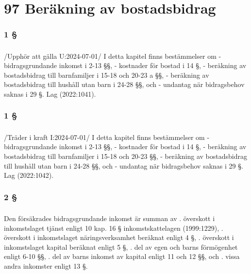\documentclass[a4paper,notitlepage,openany,10pt]{book}
\begin{document}
\chapter*{97 Beräkning av bostadsbidrag}
\subsection*{1 §}
\paragraph*{}
/Upphör att gälla U:2024-07-01/
I detta kapitel finns bestämmelser om
\newline - bidragsgrundande inkomst i 2-13 §§,
\newline - kostnader för bostad i 14 §,
\newline - beräkning av bostadsbidrag till barnfamiljer i 15-18 och 20-23 a §§,
\newline - beräkning av bostadsbidrag till hushåll utan barn i 24-28 §§, och
\newline - undantag när bidragsbehov saknas i 29 §.
Lag (2022:1041).
\subsection*{1 §}
\paragraph*{}
/Träder i kraft I:2024-07-01/
I detta kapitel finns bestämmelser om
\newline - bidragsgrundande inkomst i 2-13 §§,
\newline - kostnader för bostad i 14 §,
\newline - beräkning av bostadsbidrag till barnfamiljer i 15-18 och 20-23 §§,
\newline - beräkning av bostadsbidrag till hushåll utan barn i 24-28 §§, och
\newline - undantag när bidragsbehov saknas i 29 §.
Lag (2022:1042).
\subsection*{2 §}
\paragraph*{}
Den försäkrades bidragsgrundande inkomst är summan av
. överskott i inkomstslaget tjänst enligt 10 kap. 16 § inkomstskattelagen (1999:1229),
. överskott i inkomstslaget näringsverksamhet beräknat enligt 4 §,
. överskott i inkomstslaget kapital beräknat enligt 5 §,
. del av egen och barns förmögenhet enligt 6-10 §§,
. del av barns inkomst av kapital enligt 11 och 12 §§, och
. vissa andra inkomster enligt 13 §.
\end{document}
